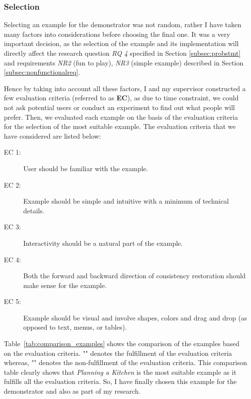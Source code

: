 \subsubsection{Selection}\label{subsubsec:exampleselection}
Selecting an example for the demonstrator was not random, rather I have taken many factors into considerations before choosing the final one. It was a very important decision, as the selection of the example and its implementation will directly affect the research question \textit{RQ 4} specified in Section \ref{subsec:probstmt} and requirements \textit{NR2} (fun to play), \textit{NR3} (simple example) described in Section \ref{subsec:nonfunctionalreq}.

Hence by taking into account all these factors, I and my supervisor constructed a few evaluation criteria (referred to as \textbf{EC}), as due to time constraint, we could not ask potential users or conduct an experiment to find out what people will prefer. Then, we evaluated each example on the basis of the evaluation criteria for the selection of the most suitable example. The evaluation criteria that we have considered are listed below:
\begin{description}
	\item [EC 1:] User should be familiar with the example.
	\item [EC 2:] Example should be simple and intuitive with a minimum of technical details.
	\item [EC 3:] Interactivity should be a natural part of the example.
	\item [EC 4:] Both the forward and backward direction of consistency restoration should make sense for the example.
	\item [EC 5:] Example should be visual and involve shapes, colors and drag and drop (as opposed to text, menus, or tables).
\end{description}

Table~\ref{tab:comparison_examples} shows the comparison of the examples based on the evaluation criteria. "\checkmark" denotes the fulfillment of the evaluation criteria whereas, "" denotes the non-fulfillment of the evaluation criteria. This comparison table clearly shows that \textit{Planning a Kitchen} is the most suitable example as it fulfills all the evaluation criteria. So, I have finally chosen this example for the demonstrator and also as part of my research.

